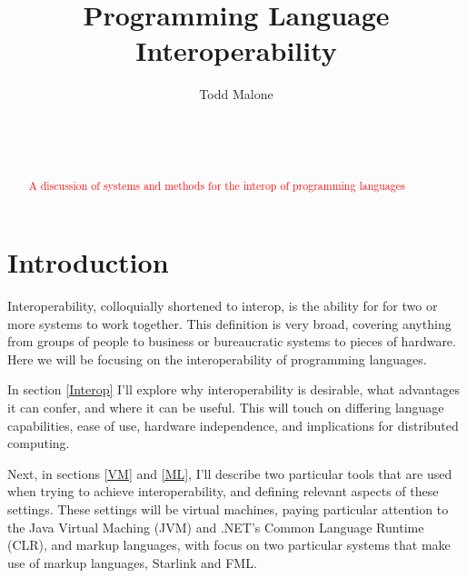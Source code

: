 \documentclass{sig-alternate}
\newcommand{\mycomment}[1]{\textcolor{red}{#1}}
\begin{document}

\title{Programming Language Interoperability}


\author{
\alignauthor
Todd Malone\\
	\\
	\\
	\\
}

\maketitle
\begin{abstract}
\mycomment{A discussion of systems and methods for the interop of programming languages}
\end{abstract}


\section{Introduction}
Interoperability, colloquially shortened to interop, is the ability for for two or more systems to work together. This definition is very broad, covering anything from groups of people to business or bureaucratic systems to pieces of hardware. Here we will be focusing on the interoperability of programming languages.

In section \ref{Interop} I'll explore why interoperability is desirable, what advantages it can confer, and where it can be useful. This will touch on differing language capabilities, ease of use, hardware independence, and implications for distributed computing.

Next, in sections \ref{VM} and \ref{ML}, I'll describe two particular tools that are used when trying to achieve interoperability, and defining relevant aspects of these settings. These settings will be virtual machines, paying particular attention to the Java Virtual Maching (JVM) and .NET's Common Language Runtime (CLR), and markup languages, with focus on two particular systems that make use of markup languages, Starlink and FML.
\end{document}
